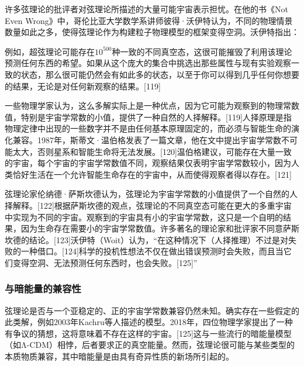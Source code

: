 许多弦理论的批评者对弦理论所描述的大量可能宇宙表示担忧。在他的书《Not Even Wrong》中，哥伦比亚大学数学系讲师彼得·沃伊特认为，不同的物理情景数量如此之多，使得弦理论作为构建粒子物理模型的框架变得空洞。沃伊特指出：

例如，超弦理论可能存在\(10^{500}\)种一致的不同真空态，这很可能摧毁了利用该理论预测任何东西的希望。如果从这个庞大的集合中挑选出那些属性与现有实验观察一致的状态，那么很可能仍然会有如此多的状态，以至于你可以得到几乎任何你想要的结果，无论是对任何新观察的结果。[119]

一些物理学家认为，这么多解实际上是一种优点，因为它可能为观察到的物理常数值，特别是宇宙学常数的小值，提供了一种自然的人择解释。[119]人择原理是指物理定律中出现的一些数字并不是由任何基本原理固定的，而必须与智能生命的演化兼容。1987年，斯蒂文·温伯格发表了一篇文章，他在文中提出宇宙学常数不可能太大，否则星系和智能生命将无法发展。[120]温伯格建议，可能存在大量一致的宇宙，每个宇宙的宇宙学常数值不同，观察结果仅表明宇宙学常数较小，因为人类恰好生活在一个允许智能生命存在的宇宙中，从而使得观察者得以存在。[121]

弦理论家伦纳德·萨斯坎德认为，弦理论为宇宙学常数的小值提供了一个自然的人择解释。[122]根据萨斯坎德的观点，弦理论的不同真空态可能在更大的多重宇宙中实现为不同的宇宙。观察到的宇宙具有小的宇宙学常数，这只是一个自明的结果，因为生命存在需要小的宇宙学常数值。许多著名的理论家和批评家不同意萨斯坎德的结论。[123]沃伊特（Woit）认为，“在这种情况下（人择推理）不过是对失败的一种借口。[124]科学的投机性想法不仅在做出错误预测时会失败，而且当它们变得空洞、无法预测任何东西时，也会失败。[125]”
\subsubsection{与暗能量的兼容性}
弦理论是否与一个亚稳定的、正的宇宙学常数兼容仍然未知。确实存在一些假定的此类解，例如2003年Kachru等人描述的模型。2018年，四位物理学家提出了一种有争议的猜想，这将意味着不存在这样的宇宙。[125]这与一些流行的暗能量模型（如Λ-CDM）相悖，后者要求正的真空能量。然而，弦理论很可能与某些类型的本质物质兼容，其中暗能量是由具有奇异性质的新场所引起的。